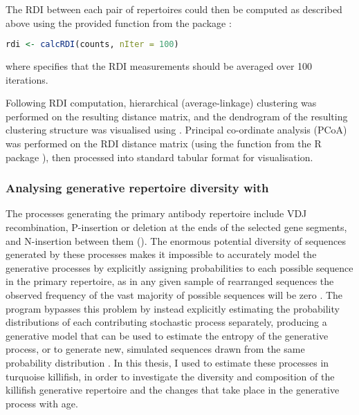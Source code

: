 \noindent The RDI between each pair of repertoires could then be computed as described above using the provided  function from the  package \parencite{bolen2017rdi}:

\begin{lstlisting}[language=R]
rdi <- calcRDI(counts, nIter = 100)
\end{lstlisting}

\noindent where  specifies that the RDI measurements should be averaged over 100 iterations.

Following RDI computation, hierarchical (average-linkage) clustering was performed on the resulting distance matrix, and the dendrogram of the resulting clustering structure was visualised using . Principal co-ordinate analysis (PCoA) was performed on the RDI distance matrix (using the  function from the R package  \parencite{paradis2018ape}), then processed into standard tabular format for visualisation.

\subsubsection{Analysing generative repertoire diversity with }
\label{sec:methods_comp_igdownstream_igor}

The processes generating the primary antibody repertoire include VDJ recombination, P-insertion or deletion at the ends of the selected gene segments, and N-insertion between them (). The enormous potential diversity of sequences generated by these processes makes it impossible to accurately model the generative processes by explicitly assigning probabilities to each possible sequence in the primary repertoire, as in any given sample of rearranged sequences the observed frequency of the vast majority of possible sequences will be zero \parencite{marcou2018igor}. The program  bypasses this problem by instead explicitly estimating the probability distributions of each contributing stochastic process separately, producing a generative model that can be used to estimate the entropy of the generative process, or to generate new, simulated sequences drawn from the same probability distribution \parencite{marcou2018igor}. In this thesis, I used  to estimate these processes in turquoise killifish, in order to investigate the diversity and composition of the killifish generative repertoire and the changes that take place in the generative process with age.

